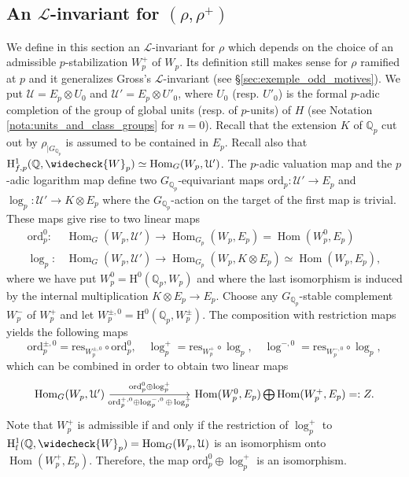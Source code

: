 \documentclass[12pt]{amsart}
\newcommand\bQ{\mathbb{Q}}
\newcommand\Qp{{\mathbb{Q}_p}}
\newcommand\cL{\mathcal{L}}
\newcommand\cU{\mathcal{U}}
\newcommand{\res}{\mathrm{res}}
\newcommand{\ord}{\mathrm{ord}}
\DeclareMathOperator{\Hom}{Hom}
\newcommand{\HH}{\mathrm{H}}
\newcommand{\ff}{\mathrm{f}}
\theoremstyle{defstyle}
\theoremstyle{thmstyle}
\begin{document}
\subsection{An $\cL$-invariant for $(\rho,\rho^+)$}\label{sec:L-invariant}
We define in this section an $\cL$-invariant for $\rho$ which depends on the choice of an admissible $p$-stabilization $W_p^+$ of $W_p$. Its definition still makes sense for $\rho$ ramified at $p$ and it generalizes Gross's $\cL$-invariant (see \S\ref{sec:exemple_odd_motives}). We put $\cU = {E_p} \otimes U_0$ and $\cU'= {E_p} \otimes U'_0$, where $U_0$ (resp. $U'_0$) is the formal $p$-adic completion of the group of global units (resp. of $p$-units) of $H$ (see Notation \ref{nota:units_and_class_groups} for $n=0$). Recall that the extension $K$ of $\Qp$ cut out by $\rho_{\big| G_{\Qp}}$ is assumed to be contained in $E_p$. Recall also that $\HH^1_{f,p}(\bQ,\widecheck{W}_p) \simeq \Hom_G(W_{p},\cU')$. The $p$-adic valuation map and the $p$-adic logarithm map define two $G_{\Qp}$-equivariant maps $\ord_p : \cU' \longrightarrow {E_p}$ and $\log_p : \cU' \longrightarrow K \otimes {E_p}$ where the $G_{\Qp}$-action on the target of the first map is trivial. These maps give rise to two linear maps 
$$\begin{aligned}
\ord_p^0 : & \Hom_G(W_{p},\cU') \longrightarrow \Hom_{G_p}(W_{p},{E_p})=\Hom(W^0_{p},{E_p}) \\
\log_p :  & \Hom_G(W_{p},\cU') \longrightarrow \Hom_{G_p}(W_{p},K \otimes{E_p})\simeq\Hom(W_{p},{E_p}),
\end{aligned}$$
where we have put $W^0_{p} = \HH^0(\Qp,W_{p})$ and where the last isomorphism is induced by the internal multiplication $K \otimes {E_p} \rightarrow {E_p}$. Choose any $G_{\Qp}$-stable complement $W^-_{p}$ of $W^+_{p}$ and let $W_{p}^{\pm,0}=\HH^0(\Qp,W^\pm_{p})$. The composition with restriction maps yields the following maps $$\ord_p^{\pm,0}=\res_{W_{p}^{\pm,0}} \circ \ord_p^0, \quad \log_p^+ = \res_{W_{p}^{+}} \circ \log_p, \quad \log^{-,0} = \res_{W_{p}^{-,0}} \circ \log_p, $$
which can be combined in order to obtain two linear maps
$$\begin{tikzcd}[column sep = 17ex]\Hom_G(W_{p}, \cU') \ar[r, "\ord_p^0 \oplus \log_p^+", "\ord_p^{+,0} \oplus \log_p^{-,0}\oplus \log_p^+"'] & \Hom(W_{p}^0,{E_p}) \bigoplus \Hom(W_{p}^+,{E_p})=:Z. \end{tikzcd}$$
Note that $W_p^+$ is admissible if and only if the restriction of $\log_p^+$ to $\HH^1_\ff(\bQ,\widecheck{W}_p) =\Hom_G(W_{p},\cU)$ is an isomorphism onto $\Hom(W^+_{p}, {E_p})$. Therefore, the map $\ord_p^0 \oplus \log_p^+$ is an isomorphism.
\end{document}
